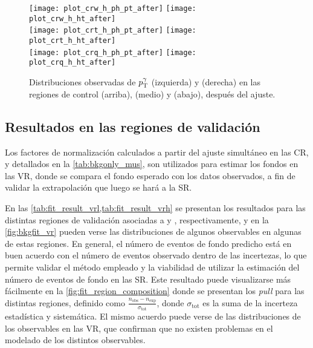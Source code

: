 \begin{figure}[!htb]
  \centering

  \texttt{[image: plot\_crw\_h\_ph\_pt\_after]}
  \texttt{[image: plot\_crw\_h\_ht\_after]} \\

  \texttt{[image: plot\_crt\_h\_ph\_pt\_after]}
  \texttt{[image: plot\_crt\_h\_ht\_after]} \\

  \texttt{[image: plot\_crq\_h\_ph\_pt\_after]}
  \texttt{[image: plot\_crq\_h\_ht\_after]} \\

  \caption{Distribuciones observadas de $p_{\mathrm{T}}^\gamma$ (izquierda) y {\HT} (derecha) en las
    regiones de control {\CRWH} (arriba), {\CRTH} (medio) y {\CRQH} (abajo),
    después del ajuste.}
  \label{fig:bkgfit_crh_after}

\end{figure}





\subsection{Resultados en las regiones de validación}

Los factores de normalización calculados a partir del ajuste simultáneo en las
CR, y detallados en la \cref{tab:bkgonly_mus}, son utilizados para estimar los
fondos en las VR, donde se compara el fondo esperado con los datos observados, a
fin de validar la extrapolación que luego se hará a la SR.

En las \cref{tab:fit_result_vrl,tab:fit_result_vrh} se presentan los resultados
para las distintas regiones de validación asociadas a {\SRL} y {\SRH},
respectivamente, y en la \cref{fig:bkgfit_vr} pueden verse las distribuciones
de algunos observables en algunas de estas regiones. En general, el número de
eventos de fondo predicho está en buen acuerdo con el número de eventos
observado dentro de las incertezas, lo que permite validar el método empleado y
la viabilidad de utilizar la estimación del número de eventos de fondo en las
SR. Este resultado puede visualizarse más fácilmente en la
\cref{fig:fit_region_composition} donde se presentan los \emph{pull} para las
distintas regiones, definido como $\frac{n_\text{obs} - n_\text{exp}}{\sigma_\text{tot}}$,
donde $\sigma_\text{tot}$ es la suma de la incerteza estadística y sistemática.
El mismo acuerdo puede verse de las distribuciones de los
observables en las VR, que confirman que no existen problemas en el
modelado de los distintos observables.

